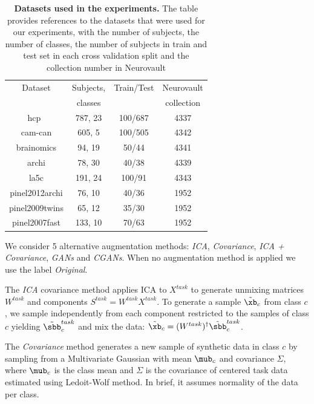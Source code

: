 \begin{table}
\begin{center}
\begin{tabular}{c|c|c|c}
\hline
Dataset & Subjects, & Train/Test & Neurovault \\
 & classes  &  & collection 
\\ \hline
hcp~\cite{van2013wu}  & 787, 23 & 100/687  &  4337
\\
cam-can \cite{shafto2014cambridge}  & 605, 5 & 100/505  &  4342
\\
brainomics \cite{orfanos2017brainomics}  & 94, 19 & 50/44  &   4341
\\
archi \cite{pinel2019functional}  & 78, 30 & 40/38  &  4339
\\
la5c \cite{poldrack2016phenome}  & 191, 24 & 100/91  &  4343
\\
pinel2012archi \cite{pinel2019functional} & 76, 10 & 40/36  &  1952
\\
pinel2009twins \cite{pinel2013genetic}  & 65, 12 & 35/30  &  1952
\\
pinel2007fast \cite{pinel2007fast} & 133, 10 & 70/63  &  1952
\\\hline\hline
\end{tabular}
\end{center}
\caption{\textbf{Datasets used in the experiments.} The table provides
  references to the datasets that were used for our experiments, with
  the number of subjects, the number of classes, the number of subjects in train
  and test set in each cross validation split and the collection number in Neurovault}
  \label{fig:dataset:tab}
\end{table}


We consider 5 alternative
augmentation methods: \emph{ICA}, \emph{Covariance}, \emph{ICA + Covariance}, \emph{GANs} and \emph{CGANs}.
%
When no augmentation method is applied we use the label \emph{Original}.

The \emph{ICA} covariance method applies ICA to $X^{task}$ to generate unmixing matrices $W^{task}$ and
components $S^{task}=  W^{task} X^{task}$.
%
To generate a sample $\tilde{\xb}_c$ from class $c$, we sample
independently from each component restricted to the samples of class $c$ yielding $\tilde{\sbb}^{task}_c$ and mix the data: $\tilde{\xb}_c = (W^{task})^{\dagger}
\tilde{\sbb}^{task}_c$.
%

The \emph{Covariance} method generates a new sample of
synthetic data in class $c$ by sampling from a Multivariate Gaussian
with mean $\mub_c$ and covariance $\Sigma$, where $\mub_c$ is the
class mean and $\Sigma$ is the covariance of centered task data
estimated using Ledoit-Wolf method.
%
In brief, it assumes normality of the data per class.

